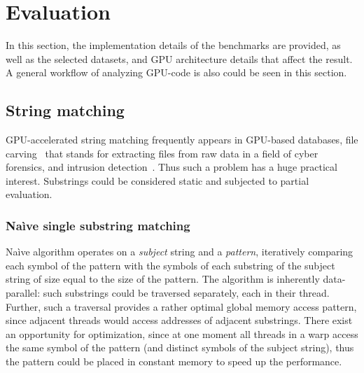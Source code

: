 \section{Evaluation}
In this section, the implementation details of the benchmarks are provided,
as well as the selected datasets, and GPU architecture details that affect
the result. A general workflow of analyzing GPU-code is also could be seen
in this section.

\subsection{String matching}
GPU-accelerated string matching frequently appears in GPU-based data\-bases,
file carving~\cite{DataCarving,GPU-carving} that stands for extracting
files from raw data in a field of cyber forensics, and intrusion
detection~\cite{GPU-IDS}. Thus such a problem has a huge practical
interest. Substrings could be considered static and subjected to
partial evaluation.

\subsubsection{Na\`ive single substring matching}\label{naive-single}
Na\`ive algorithm operates on a \emph{subject} string and a \emph{pattern},
iteratively comparing each symbol of the pattern with the
symbols of each substring of the subject string of size equal to the size
of the pattern. The algorithm is inherently data-parallel: such substrings
could be traversed separately, each in their thread. Further, such a traversal
provides a rather optimal global memory access pattern, since adjacent
threads would access addresses of adjacent substrings. There exist an opportunity
for optimization, since at one moment all threads in a warp access the same symbol
of the pattern (and distinct symbols of the subject string), thus the pattern could
be placed in constant memory to speed up the performance.



